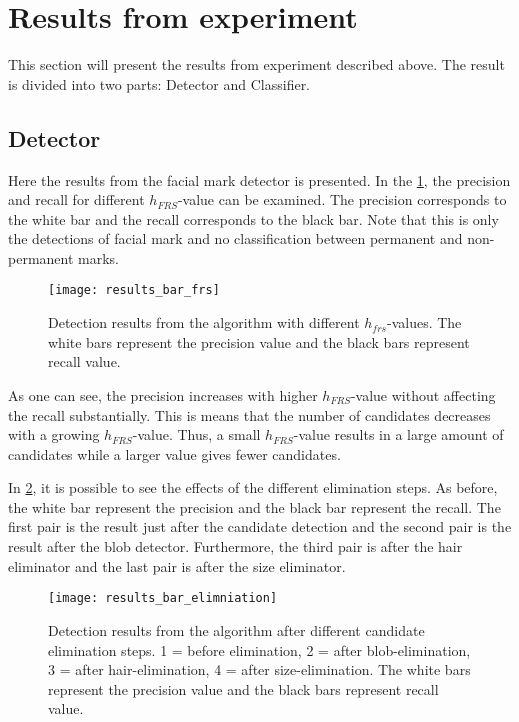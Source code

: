 \section{Results from experiment}

This section will present the results from experiment described above. The result is divided into two parts: Detector and Classifier. 

\subsection{Detector}

Here the results from the facial mark detector is presented. In the \cref{fig:results_bar_frs}, the precision and recall for different $h_{FRS}$-value can be examined. The precision corresponds to the white bar and the recall corresponds to the black bar. Note that this is only the detections of facial mark and no classification between permanent and non-permanent marks. 

\FloatBarrier
\begin{figure}[h!]
	\centering
	\texttt{[image: results\_bar\_frs]}
	\caption{Detection results from the algorithm with different $h_{frs}$-values. The white bars represent the precision value and the black bars represent recall value.  \label{fig:results_bar_frs}}
\end{figure}
\FloatBarrier

As one can see, the precision increases with higher $h_{FRS}$-value without affecting the recall substantially. This is means that the number of candidates decreases with a growing $h_{FRS}$-value. Thus, a small $h_{FRS}$-value results in a large amount of candidates while a larger value gives fewer candidates.

In \cref{fig:results_bar_elimniation}, it is possible to see the effects of the different elimination steps. As before, the white bar represent the precision and the black bar represent the recall. The first pair is the result just after the candidate detection and the second pair is the result after the blob detector. Furthermore, the third pair is after the hair eliminator and the last pair is after the size eliminator. 

\FloatBarrier
\begin{figure}[h!]
	\centering
	\texttt{[image: results\_bar\_elimniation]}
	\caption{Detection results from the algorithm  after different candidate elimination steps. 1 = before elimination, 2 = after blob-elimination, 3 = after hair-elimination, 4 = after size-elimination. The white bars represent the precision value and the black bars represent recall value.  \label{fig:results_bar_elimniation}}
\end{figure}
\FloatBarrier

